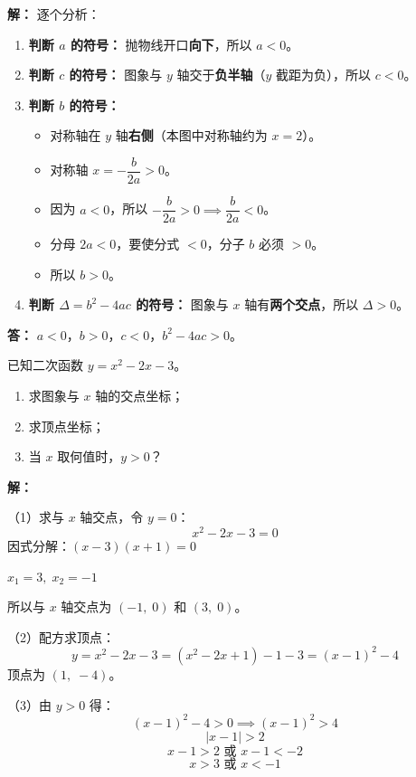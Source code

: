 \documentclass[12pt, a4paper]{ctexart}
\begin{document}
\textbf{解：} 逐个分析：
\begin{enumerate}[leftmargin=2em]
  \item \textbf{判断 $a$ 的符号：} 抛物线开口\textbf{向下}，所以 $a < 0$。
  \item \textbf{判断 $c$ 的符号：} 图象与 $y$ 轴交于\textbf{负半轴}（$y$ 截距为负），所以 $c < 0$。
  \item \textbf{判断 $b$ 的符号：}
  \begin{itemize}
    \item 对称轴在 $y$ 轴\textbf{右侧}（本图中对称轴约为 $x = 2$）。
    \item 对称轴 $x = -\dfrac{b}{2a} > 0$。
    \item 因为 $a < 0$，所以 $-\dfrac{b}{2a} > 0 \implies \dfrac{b}{2a} < 0$。
    \item 分母 $2a < 0$，要使分式 $< 0$，分子 $b$ 必须 $> 0$。
    \item 所以 $b > 0$。
  \end{itemize}
  \item \textbf{判断 $\Delta = b^2 - 4ac$ 的符号：} 图象与 $x$ 轴有\textbf{两个交点}，所以 $\Delta > 0$。
\end{enumerate}

\textbf{答：} $a < 0$，$b > 0$，$c < 0$，$b^2 - 4ac > 0$。

\begin{examplebox}[【例题 8】二次函数与方程综合]
已知二次函数 $y = x^2 - 2x - 3$。
\begin{enumerate}[label=(\arabic*)]
  \item 求图象与 $x$ 轴的交点坐标；
  \item 求顶点坐标；
  \item 当 $x$ 取何值时，$y > 0$？
\end{enumerate}
\end{examplebox}

\textbf{解：}

（1）求与 $x$ 轴交点，令 $y = 0$：
\[
x^2 - 2x - 3 = 0
\]
因式分解：$(x - 3)(x + 1) = 0$

$x_1 = 3,\; x_2 = -1$

所以与 $x$ 轴交点为 $(-1,\; 0)$ 和 $(3,\; 0)$。

（2）配方求顶点：
\[
y = x^2 - 2x - 3 = (x^2 - 2x + 1) - 1 - 3 = (x - 1)^2 - 4
\]
顶点为 $(1,\; -4)$。

（3）由 $y > 0$ 得：
\[
(x - 1)^2 - 4 > 0 \implies (x - 1)^2 > 4
\]
\[
|x - 1| > 2
\]
\[
x - 1 > 2 \text{ 或 } x - 1 < -2
\]
\[
x > 3 \text{ 或 } x < -1
\]
\end{document}

